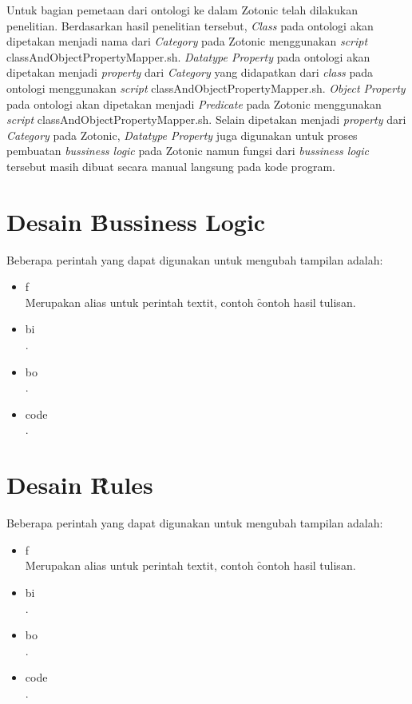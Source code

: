 Untuk bagian pemetaan dari ontologi ke dalam Zotonic telah dilakukan penelitian. Berdasarkan hasil penelitian tersebut, \textit{Class} pada ontologi akan dipetakan menjadi nama dari \textit{Category} pada Zotonic menggunakan \textit{script} classAndObjectPropertyMapper.sh. \textit{Datatype Property} pada ontologi akan dipetakan menjadi \textit{property} dari \textit{Category} yang didapatkan dari \textit{class} pada ontologi menggunakan \textit{script} classAndObjectPropertyMapper.sh. \textit{Object Property} pada ontologi akan dipetakan menjadi \textit{Predicate} pada Zotonic menggunakan \textit{script} classAndObjectPropertyMapper.sh. Selain dipetakan menjadi \textit{property} dari \textit{Category} pada Zotonic, \textit{Datatype Property} juga digunakan untuk proses pembuatan \textit{bussiness logic} pada Zotonic namun fungsi dari \textit{bussiness logic} tersebut masih dibuat secara manual langsung pada kode program.

\section{Desain \f{Bussiness Logic}}
Beberapa perintah yang dapat digunakan untuk mengubah tampilan adalah: 
\begin{itemize}
	\item \bslash f \\
		Merupakan alias untuk perintah \bslash textit, contoh 
		\f{contoh hasil tulisan}.
	\item \bslash bi \\
		.
	\item \bslash bo \\
		.
	\item \bslash code \\ 
		.
\end{itemize}

\section{Desain \f{Rules}}
Beberapa perintah yang dapat digunakan untuk mengubah tampilan adalah: 
\begin{itemize}
	\item \bslash f \\
		Merupakan alias untuk perintah \bslash textit, contoh 
		\f{contoh hasil tulisan}.
	\item \bslash bi \\
		.
	\item \bslash bo \\
		.
	\item \bslash code \\ 
		.
\end{itemize}
